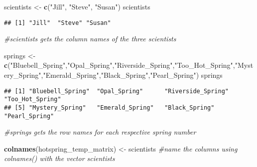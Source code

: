 \documentclass[
]{article}
\newenvironment{Shaded}{\begin{snugshade}}{\end{snugshade}}
\newcommand{\CommentTok}[1]{\textcolor[rgb]{0.56,0.35,0.01}{\textit{#1}}}
\newcommand{\FunctionTok}[1]{\textcolor[rgb]{0.13,0.29,0.53}{\textbf{#1}}}
\newcommand{\NormalTok}[1]{#1}
\newcommand{\OtherTok}[1]{\textcolor[rgb]{0.56,0.35,0.01}{#1}}
\newcommand{\StringTok}[1]{\textcolor[rgb]{0.31,0.60,0.02}{#1}}
\begin{document}
\begin{Shaded}
\begin{Highlighting}[]
\NormalTok{scientists }\OtherTok{\textless{}{-}} \FunctionTok{c}\NormalTok{(}\StringTok{"Jill"}\NormalTok{, }\StringTok{"Steve"}\NormalTok{, }\StringTok{"Susan"}\NormalTok{)}
\NormalTok{scientists}
\end{Highlighting}
\end{Shaded}

\begin{verbatim}
## [1] "Jill"  "Steve" "Susan"
\end{verbatim}

\begin{Shaded}
\begin{Highlighting}[]
\CommentTok{\#scientists gets the column names of the three scientists }
\end{Highlighting}
\end{Shaded}

\begin{Shaded}
\begin{Highlighting}[]
\NormalTok{springs }\OtherTok{\textless{}{-}} \FunctionTok{c}\NormalTok{(}\StringTok{"Bluebell\_Spring"}\NormalTok{,}\StringTok{"Opal\_Spring"}\NormalTok{,}\StringTok{"Riverside\_Spring"}\NormalTok{,}\StringTok{"Too\_Hot\_Spring"}\NormalTok{,}\StringTok{"Mystery\_Spring"}\NormalTok{,}\StringTok{"Emerald\_Spring"}\NormalTok{,}\StringTok{"Black\_Spring"}\NormalTok{,}\StringTok{"Pearl\_Spring"}\NormalTok{)}
\NormalTok{springs}
\end{Highlighting}
\end{Shaded}

\begin{verbatim}
## [1] "Bluebell_Spring"  "Opal_Spring"      "Riverside_Spring" "Too_Hot_Spring"  
## [5] "Mystery_Spring"   "Emerald_Spring"   "Black_Spring"     "Pearl_Spring"
\end{verbatim}

\begin{Shaded}
\begin{Highlighting}[]
\CommentTok{\#springs gets the row names for each respective spring number}
\end{Highlighting}
\end{Shaded}

\begin{Shaded}
\begin{Highlighting}[]
\FunctionTok{colnames}\NormalTok{(hotspring\_temp\_matrix) }\OtherTok{\textless{}{-}}\NormalTok{ scientists}
\CommentTok{\#name the columns using \textquotesingle{}colnames()\textquotesingle{} with the vector scientists}
\end{Highlighting}
\end{Shaded}
\end{document}
